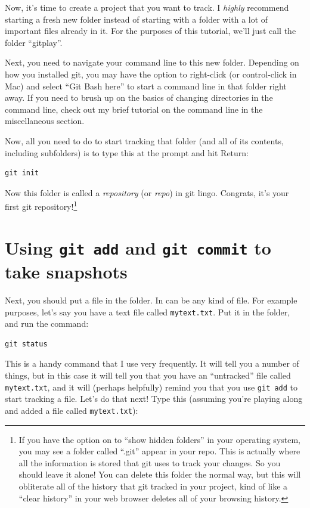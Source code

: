 \documentclass[11pt]{article}
\begin{document}
Now, it's time to create a project that you want to track.  I \emph{highly} recommend starting a fresh new folder instead of starting with a folder with a lot of important files already in it.  For the purposes of this tutorial, we'll just call the folder ``gitplay''.

Next, you need to navigate your command line to this new folder.  Depending on how you installed git, you may have the option to right-click (or control-click in Mac) and select ``Git Bash here'' to start a command line in that folder right away. If you need to brush up on the basics of changing directories in the command line, check out my brief tutorial on the command line in the miscellaneous section.

Now, all you need to do to start tracking that folder (and all of its contents, including subfolders) is to type this at the prompt and hit Return:


\begin{verbatim}
git init
\end{verbatim}

Now this folder is called a \emph{repository} (or \emph{repo}) in git lingo.  Congrats, it's your first git repository!\footnote{If you have the option on to ``show hidden folders'' in your operating system, you may see a folder called ``.git'' appear in your repo. This is actually where all the information is stored that git uses to track your changes. So you should leave it alone!  You can delete this folder the normal way, but this will obliterate all of the history that git tracked in your project, kind of like a ``clear history'' in your web browser deletes all of your browsing history.
 }
\section{Using \texttt{git add} and \texttt{git commit} to take snapshots}
\label{sec-6}

Next, you should put a file in the folder. In can be any kind of file.  For example purposes, let's say you have a text file called \texttt{mytext.txt}.  Put it in the folder, and run the command:


\begin{verbatim}
git status
\end{verbatim}

This is a handy command that I use very frequently. It will tell you a number of things, but in this case it will tell you that you have an ``untracked'' file called \texttt{mytext.txt}, and it will (perhaps helpfully) remind you that you use \texttt{git add} to start tracking a file.  Let's do that next!  Type this (assuming you're playing along and added a file called \texttt{mytext.txt}):
\end{document}
